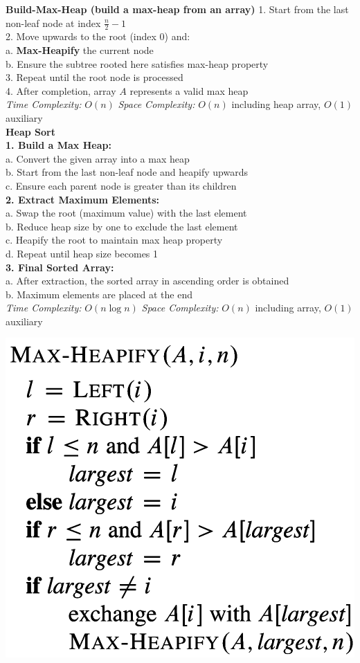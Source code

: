 {{\begin{minipage}[t]{0.65\textwidth}
        \textbf{\scriptsize Build-Max-Heap (build a max-heap from an array)}
        1. Start from the last non-leaf node at index \(\frac{n}{2} - 1\)\\
        2. Move upwards to the root (index \(0\)) and:\\
        \quad a. \textbf{Max-Heapify} the current node\\
        \quad b. Ensure the subtree rooted here satisfies max-heap property\\
        3. Repeat until the root node is processed\\
        4. After completion, array \(A\) represents a valid max heap\\
        \textit{Time Complexity:} \(O(n)\) \quad \textit{Space Complexity:} \(O(n)\) including heap array, \(O(1)\) auxiliary\\
        \textbf{\scriptsize Heap Sort}\\[-1px]
        \textbf{1. Build a Max Heap:}\\
        a. Convert the given array into a max heap\\
        b. Start from the last non-leaf node and heapify upwards\\
        c. Ensure each parent node is greater than its children\\
        \textbf{2. Extract Maximum Elements:}\\
        a. Swap the root (maximum value) with the last element\\
        b. Reduce heap size by one to exclude the last element\\
        c. Heapify the root to maintain max heap property\\
        d. Repeat until heap size becomes 1\\
        \textbf{3. Final Sorted Array:}\\
        a. After extraction, the sorted array in ascending order is obtained\\
        b. Maximum elements are placed at the end\\
        \textit{Time Complexity:} \(O(n\log n)\) \quad \textit{Space Complexity:} \(O(n)\) including array, \(O(1)\) auxiliary
    \end{minipage}
    \hfill
    \begin{minipage}[t]{0.35\textwidth}
        \vspace{2pt}
        \includegraphics[width=0.7\linewidth]{images/heapify.png}

\end{minipage}}}
